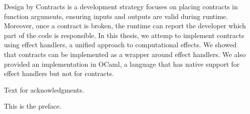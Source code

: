 
\frontmatter

\maketitle

\copyrightpage


\abstract

Design by Contracts is a development strategy focuses on placing contracts in
function arguments, ensuring inputs and outputs are valid during runtime.
Moreover, once a contract is broken, the runtime can report the developer which
part of the code is responsible. In this thesis, we attemp to implement contracts
using effect handlers, a unified approach to computational effects. We showed that
contracts can be implemented as a wrapper around effect handlers. We also provided
an implementation in OCaml, a language that has native support for effect handlers
but not for contracts.


\acknowledgements

Text for acknowledgments.

\preface

This is the preface.


%
%
%
%
%
%
%
%

\clearpage{} %
\tableofcontents	%

\clearpage{} %
\listoftables		%

\clearpage{} %
\listoffigures		%



\mainmatter             %

